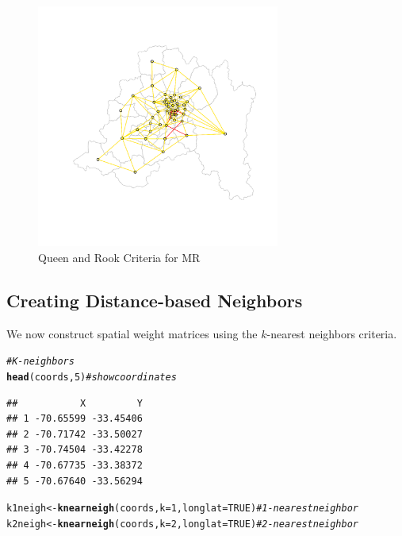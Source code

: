 \documentclass[english,12pt]{book}\usepackage[]{graphicx}\usepackage[]{xcolor}
\makeatletter
\newcommand{\hlnum}[1]{\textcolor[rgb]{0.686,0.059,0.569}{#1}}%
\newcommand{\hlcom}[1]{\textcolor[rgb]{0.678,0.584,0.686}{\textit{#1}}}%
\newcommand{\hlstd}[1]{\textcolor[rgb]{0.345,0.345,0.345}{#1}}%
\newcommand{\hlkwb}[1]{\textcolor[rgb]{0.69,0.353,0.396}{#1}}%
\newcommand{\hlkwc}[1]{\textcolor[rgb]{0.333,0.667,0.333}{#1}}%
\newcommand{\hlkwd}[1]{\textcolor[rgb]{0.737,0.353,0.396}{\textbf{#1}}}%
\newenvironment{kframe}{%
 \def\at@end@of@kframe{}%
 \ifinner\ifhmode%
  \def\at@end@of@kframe{\end{minipage}}%
  \begin{minipage}{\columnwidth}%
 \fi\fi%
 \def\FrameCommand##1{\hskip\@totalleftmargin \hskip-\fboxsep
 \colorbox{shadecolor}{##1}\hskip-\fboxsep
     \hskip-\linewidth \hskip-\@totalleftmargin \hskip\columnwidth}%
 \MakeFramed {\advance\hsize-\width
   \@totalleftmargin\z@ \linewidth\hsize
   \@setminipage}}%
 {\par\unskip\endMakeFramed%
 \at@end@of@kframe}
\newenvironment{knitrout}{}{} %
\makeatother
\begin{document}
\begin{figure}[ht]
  \caption{Queen and Rook Criteria for MR}
    \label{fig:Queen-Rook}
\begin{knitrout}
\color{fgcolor}

{\centering \includegraphics[width=8cm,height=8cm]{figure/plot-queen-rookT-1} 

}


\end{knitrout}
\end{figure}

\subsection{Creating Distance-based Neighbors}

We now construct spatial weight matrices using the $k$-nearest neighbors criteria. 

\begin{knitrout}
\color{fgcolor}\begin{kframe}
\begin{alltt}
\hlcom{# K-neighbors}
\hlkwd{head}\hlstd{(coords,} \hlnum{5}\hlstd{)}                                       \hlcom{# show coordinates}
\end{alltt}
\begin{verbatim}
##           X         Y
## 1 -70.65599 -33.45406
## 2 -70.71742 -33.50027
## 3 -70.74504 -33.42278
## 4 -70.67735 -33.38372
## 5 -70.67640 -33.56294
\end{verbatim}
\begin{alltt}
\hlstd{k1neigh} \hlkwb{<-} \hlkwd{knearneigh}\hlstd{(coords,} \hlkwc{k} \hlstd{=} \hlnum{1}\hlstd{,} \hlkwc{longlat} \hlstd{=} \hlnum{TRUE}\hlstd{)}  \hlcom{# 1-nearest neighbor}
\hlstd{k2neigh} \hlkwb{<-} \hlkwd{knearneigh}\hlstd{(coords,} \hlkwc{k} \hlstd{=} \hlnum{2}\hlstd{,} \hlkwc{longlat} \hlstd{=} \hlnum{TRUE}\hlstd{)}  \hlcom{# 2-nearest neighbor}
\end{alltt}
\end{kframe}
\end{knitrout}
\end{document}
